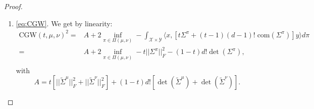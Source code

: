 \documentclass{article}
\newcommand{\Y}{\mathcal{Y}}
\newcommand{\X}{\mathcal{X}}
\newcommand{\1}{\mathbf{1}}
\newcommand{\DGW}{\mathrm{DGW}}
\newcommand{\CGW}{\mathrm{CGW}}
\theoremstyle{definition}
\theoremstyle{remark}
\begin{document}
\begin{appendices}
\begin{proof}
\begin{enumerate}
        \begin{equation*}
            \begin{split}
                T_{\pi}&=  d! \det(\Sigma^\pi)\\
                & = (d-1)!\sum_{i,j}\Sigma^\pi_{i,j}(-1)^{i+j}\Delta_{i,j}\\
                & = (d-1)!\int \langle x,\textrm{com}(\Sigma^\pi) y\rangle d\pi,\\
            \end{split}
        \end{equation*}
         with $\mathrm{com}(M)$ the matrix of cofactors of $M$. Thus,
        \begin{equation}
        \begin{split}\label{eq:DGW_low_dim}
        \DGW(\mu,\nu)^2=&\inf_{\pi\in\Pi(\mu,\nu)}\int_{(\X\times\Y)^d}|\det(\mathbf{x})-\det(\mathbf{y})|^2d\pi^{\otimes d}\\ 
        =&d!\det(\tilde{\Sigma}^{\mu})+ d!\det(\tilde{\Sigma}^{\nu})+2(d-1)!\inf_{\pi\in\Pi(\mu,\nu)}-\int_{(\X\times\Y)^d}\langle x,\mathrm{com}(\Sigma^{\pi}) y\rangle d\pi\\
        =&d!\left[\det(\tilde{\Sigma}^{\mu})+ \det(\tilde{\Sigma}^{\nu})+2\inf_{\pi\in\Pi(\mu,\nu)}-\det(\Sigma^{\pi})\right].
        \end{split}
    \end{equation}
    \item \ref{eq:CGW}.
    We get by linearity:
    \begin{equation}
        \begin{split}\label{eq:CGW_low_dim}
        \CGW(t,\mu,\nu)^2
        =&A+2\inf_{\pi\in\Pi(\mu,\nu)}-\int_{\X\times\Y}\langle x,[t\Sigma^{\pi}+(t-1)(d-1)!\;\mathrm{com}(\Sigma^{\pi})] y\rangle d\pi\\
        =&A+2\inf_{\pi\in\Pi(\mu,\nu)}-t||\Sigma^\pi||^2_F- (1-t)d!\det(\Sigma^{\pi}),\\
        \end{split}
    \end{equation}
    with \[A = t[||\tilde{\Sigma}^{\mu}||_F^2+||\tilde{\Sigma}^{\nu}||_F^2]+(1-t)d![\det(\tilde{\Sigma}^{\mu})+\det(\tilde{\Sigma}^{\nu})].\]
    \end{enumerate}
\end{proof}


\end{appendices}
\end{document}
